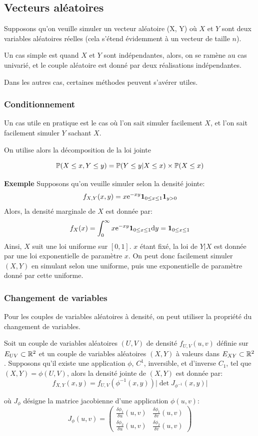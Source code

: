 \subsection{Vecteurs aléatoires}

Supposons qu'on veuille simuler un vecteur aléatoire (X, Y) où $X$ et $Y$ sont deux variables aléatoires réelles (cela s'étend évidemment à un vecteur de taille $n$). 

Un cas simple est quand $X$ et $Y$ sont indépendantes, alors, on se ramène au cas univarié, et le couple aléatoire est donné par deux réalisations indépendantes.

Dans les autres cas, certaines méthodes peuvent s'avérer utiles.

\subsubsection{Conditionnement}

Un cas utile en pratique est le cas où l'on sait simuler facilement $X$, et l'on sait facilement simuler $Y$ sachant $X$. 

On utilise alors la décomposition de la loi jointe

$$\mathbb{P}(X\leq x, Y\leq y) = \mathbb{P}(Y\leq y \vert X\leq x) \times \mathbb{P}(X\leq x)$$

\textbf{Exemple} Supposons qu'on veuille simuler selon la densité jointe:
$$f_{X,Y}(x, y) = x\text{e}^{-xy}\mathbf{1}_{0\leq x\leq 1}\mathbf{1}_{y>0}$$
Alors, la densité marginale de $X$ est donnée par:
$$f_X(x) = \int_0^\infty x\text{e}^{-xy}\mathbf{1}_{0\leq x\leq 1}\text{d} y = \mathbf{1}_{0\leq x\leq 1}$$
Ainsi, $X$ suit une loi uniforme sur $[0, 1]$. $x$ étant fixé, la loi de $Y\vert X$ est donnée par une loi exponentielle de paramètre $x$. On peut donc facilement simuler $(X, Y)$ en simulant selon une uniforme, puis une exponentielle de paramètre donné par cette uniforme.

\subsubsection{Changement de variables}

Pour les couples de variables aléatoires à densité, on peut utiliser la propriété du changement de variables. 
\begin{propriete}
Soit un couple de variables aléatoires $(U,V)$ de densité $f_{U,V}(u,v)$ définie sur $E_{UV} \subset \mathbb{R}^2$ et un couple de variables aléatoires $(X, Y)$ à valeurs dans $E_{XY} \subset \mathbb{R}^2$. Supposons qu'il existe une application $\phi$, $C^1$, inversible, et d'inverse $C_1$, tel que $(X, Y) = \phi(U, V)$, alors la densité jointe de $(X, Y)$ est donnée par:
$$f_{X,Y}(x, y) = f_{U,V}(\phi^{-1}(x, y))\vert\det J_{\phi^{-1}}(x, y)\vert  $$
\end{propriete}
où $J_\phi$ désigne la matrice jacobienne d'une application $\phi(u, v)$:
$$J_\phi(u, v) = \begin{pmatrix}
\frac{\delta \phi_1}{\delta u}(u, v) & \frac{\delta \phi_1}{\delta v}(u, v)\\
\frac{\delta \phi_2}{\delta u}(u, v) & \frac{\delta \phi_2}{\delta v}(u, v)
\end{pmatrix}$$

